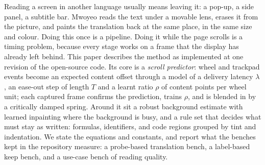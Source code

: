 Reading a screen in another language usually means leaving it: a pop-up, a side panel, a subtitle bar.
Mwoyeo reads the text under a movable lens, erases it from the picture, and paints the translation back at the same place, in
the same size and colour. Doing this once is a pipeline. Doing it while the page scrolls is a timing problem, because every
stage works on a frame that the display has already left behind.
This paper describes the method as implemented at one revision of the open-source code.
Its core is a \emph{scroll predictor}: wheel and trackpad events become an expected content offset through a model of a delivery
latency $\lambda$, an ease-out step of length $T$ and a learnt ratio $\rho$ of content points per wheel unit; each captured
frame confirms the prediction, trains $\rho$, and is blended in by a critically damped spring.
Around it sit a robust background estimate with learned inpainting where the background is busy, and a rule set that decides
what must stay as written: formulas, identifiers, and code regions grouped by tint and indentation.
We state the equations and constants, and report what the benches kept in the repository measure: a probe-based translation
bench, a label-based keep bench, and a use-case bench of reading quality.
